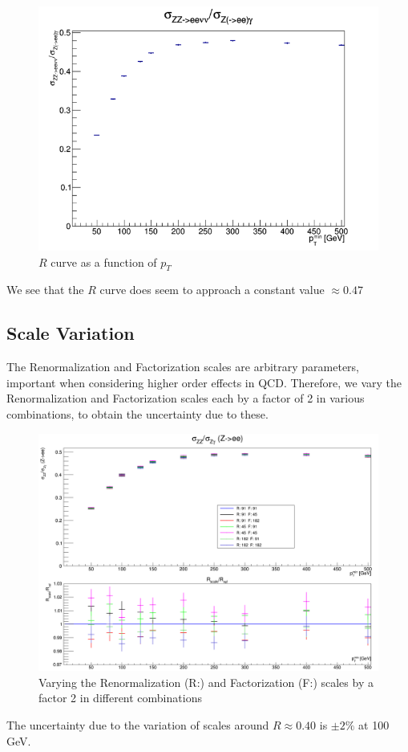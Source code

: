 \documentclass[11pt,a4paper,final]{report}
\begin{document}
\begin{figure}[H]
	\centering
	\includegraphics[scale=0.7]{Ratio_default.png}
	\caption{$R$ curve as a function of $p_T$}
\end{figure}
We see that the $R$ curve does seem to approach a constant value $\approx 0.47$

\subsection{Scale Variation}
The Renormalization and Factorization scales are arbitrary parameters, important when considering higher order effects in QCD. Therefore, we vary the Renormalization and Factorization scales each by a factor of 2 in various combinations, to obtain the uncertainty due to these.
\begin{figure}[H]
\centering
\includegraphics[width=0.8\linewidth]{scale/nlo_scale_overlay.png}
\caption{Varying the Renormalization (R:) and Factorization (F:) scales by a factor 2 in different combinations}
\end{figure}
The uncertainty due to the variation of scales around $R \approx 0.40$ is $\pm 2\%$ at 100 GeV.
\end{document}
